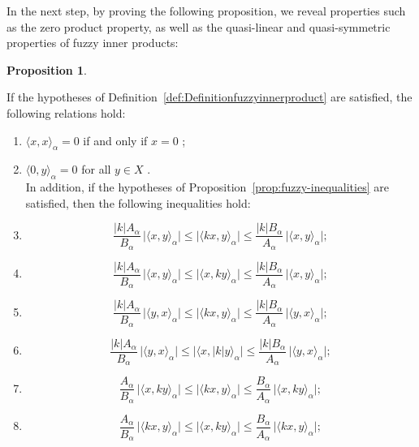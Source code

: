 \documentclass[preprint,12pt]{elsarticle}
\theoremstyle{definition}
\newtheorem{proposition}{Proposition}[section]
\begin{document}
In the next step, by proving the following proposition, we reveal properties such as the zero product property, as well as the quasi-linear and quasi-symmetric properties of fuzzy inner products:
\begin{proposition}\label{prop:fuzzy-inner-properties}
	
	If the hypotheses of Definition~\ref{def:Definitionfuzzyinnerproduct} are satisfied, the following relations hold:
	\begin{enumerate}
		\item \(\big\langle x, x\big\rangle_\alpha = 0\) if and only if \(x = 0\) ;
		\item \(\big\langle 0, y\big\rangle_\alpha = 0\) for all \(y\in X\) .\\
		In addition, if the hypotheses of Proposition~\eqref{prop:fuzzy-inequalities} are satisfied, then the following inequalities hold:
		
		
			\item 
			\[
			\frac{|k| A_\alpha}{B_\alpha} \, \big|\langle x, y \rangle_\alpha \big|
			\leq 
			\big|\langle k x, y \rangle_\alpha \big|
			\leq 
			\frac{|k| B_\alpha}{A_\alpha} \, \big|\langle x, y \rangle_\alpha \big|;
			\]
			
			\item 
			\[
			\frac{|k| A_\alpha}{B_\alpha} \, \big|\langle x, y \rangle_\alpha \big|
			\leq 
			\big|\langle x, k y \rangle_\alpha \big|
			\leq 
			\frac{|k| B_\alpha}{A_\alpha} \, \big|\langle x, y \rangle_\alpha \big|;
			\]
			
			\item 
			\[
			\frac{|k| A_\alpha}{B_\alpha} \, \big|\langle y, x \rangle_\alpha \big|
			\leq 
			\big|\langle k x, y \rangle_\alpha \big|
			\leq 
			\frac{|k| B_\alpha}{A_\alpha} \, \big|\langle y, x \rangle_\alpha \big|;
			\]
			
			\item 
			\[
			\frac{|k| A_\alpha}{B_\alpha} \, \big|\langle y, x \rangle_\alpha \big|
			\leq 
			\big|\langle x, |k| y \rangle_\alpha \big|
			\leq 
			\frac{|k| B_\alpha}{A_\alpha} \, \big|\langle y, x \rangle_\alpha \big|;
			\]
			
			\item 
			\[
			\frac{A_\alpha}{B_\alpha} \, \big|\langle x, k y \rangle_\alpha \big|
			\leq 
			\big|\langle k x, y \rangle_\alpha \big|
			\leq 
			\frac{B_\alpha}{A_\alpha} \, \big|\langle x, k y \rangle_\alpha \big|;
			\]
			
			\item 
			\[
			\frac{A_\alpha}{B_\alpha} \, \big|\langle k x, y \rangle_\alpha \big|
			\leq 
			\big|\langle x, k y \rangle_\alpha \big|
			\leq 
			\frac{B_\alpha}{A_\alpha} \, \big|\langle k x, y \rangle_\alpha \big|;
			\]
			

\end{enumerate}
\end{proposition}
\end{document}
